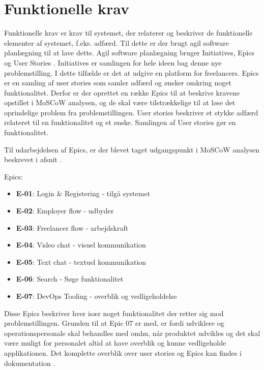 \section{Funktionelle krav}

Funktionelle krav er krav til systemet, der relaterer og beskriver de funktionelle elementer af systemet, f.eks. adfærd. Til dette er der brugt agil software planlægning til at lave dette. Agil software planlægning bruger Initiatives, Epics og User Stories . Initiatives er samlingen for hele ideen bag denne nye problemstilling. I dette tilfælde er det at udgive en platform for freelancers. Epics er en samling af user stories som samler adfærd og ønsker omkring noget funktionalitet. Derfor er der oprettet en række Epics til at beskrive kravene opstillet i MoSCoW analysen, og de skal være tilstrækkelige til at løse det oprindelige problem fra problemstillingen. User stories beskriver et stykke adfærd relateret til en funktionalitet og et ønske. Samlingen af User stories gør en funktionalitet.

Til udarbejdelsen af Epics, er der blevet taget udgangspunkt i MoSCoW analysen beskrevet i afsnit \cite[Overordnede krav]{doocumentation-kravspec}.

Epics:

\begin{itemize}
  \item \textbf{E-01}: Login \& Registering - tilgå systemet
  \item \textbf{E-02}: Employer flow - udbyder
  \item \textbf{E-03}: Freelancer flow - arbejdskraft
  \item \textbf{E-04}: Video chat - visuel kommunikation
  \item \textbf{E-05}: Text chat - textuel kommunikation
  \item \textbf{E-06}: Search - Søge funktionalitet
  \item \textbf{E-07}: DevOps Tooling - overblik og vedligeholdelse 
\end{itemize}

Disse Epics beskriver hver især noget funktionalitet der retter sig mod problemstillingen. Grunden til at Epic 07 er med, er fordi udviklere og operationspersonale skal behandles med omhu, når produktet udvikles og det skal være muligt for personalet altid at have overblik og kunne vedligeholde applikationen. Det komplette overblik over user stories og Epics kan findes i dokumentation \cite[Funktionelle krav]{doocumentation-kravspec}.
